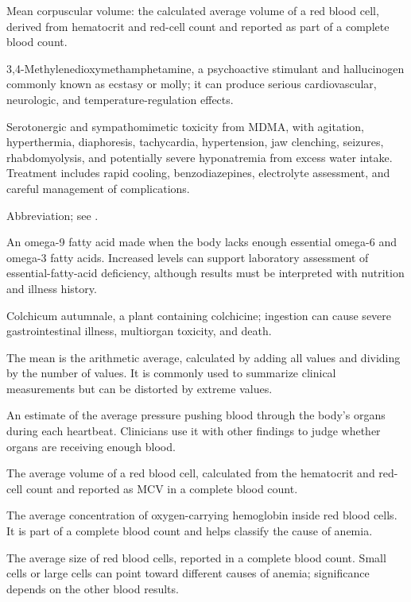  Mean corpuscular volume: the calculated average volume of a red blood cell, derived from hematocrit and red-cell count and reported as part of a complete blood count.

 3,4-Methylenedioxymethamphetamine, a psychoactive stimulant and hallucinogen commonly known as ecstasy or molly; it can produce serious cardiovascular, neurologic, and temperature-regulation effects.

 Serotonergic and sympathomimetic toxicity from MDMA, with agitation, hyperthermia, diaphoresis, tachycardia, hypertension, jaw clenching, seizures, rhabdomyolysis, and potentially severe hyponatremia from excess water intake. Treatment includes rapid cooling, benzodiazepines, electrolyte assessment, and careful management of complications.

 Abbreviation; see .

 An omega-9 fatty acid made when the body lacks enough essential omega-6 and omega-3 fatty acids. Increased levels can support laboratory assessment of essential-fatty-acid deficiency, although results must be interpreted with nutrition and illness history.

 Colchicum autumnale, a plant containing colchicine; ingestion can cause severe gastrointestinal illness, multiorgan toxicity, and death.

 The mean is the arithmetic average, calculated by adding all values and dividing by the number of values. It is commonly used to summarize clinical measurements but can be distorted by extreme values.

 An estimate of the average pressure pushing blood through the body's organs during each heartbeat. Clinicians use it with other findings to judge whether organs are receiving enough blood.

 The average volume of a red blood cell, calculated from the hematocrit and red-cell count and reported as MCV in a complete blood count.

 The average concentration of oxygen-carrying hemoglobin inside red blood cells. It is part of a complete blood count and helps classify the cause of anemia.

 The average size of red blood cells, reported in a complete blood count. Small cells or large cells can point toward different causes of anemia; significance depends on the other blood results.


